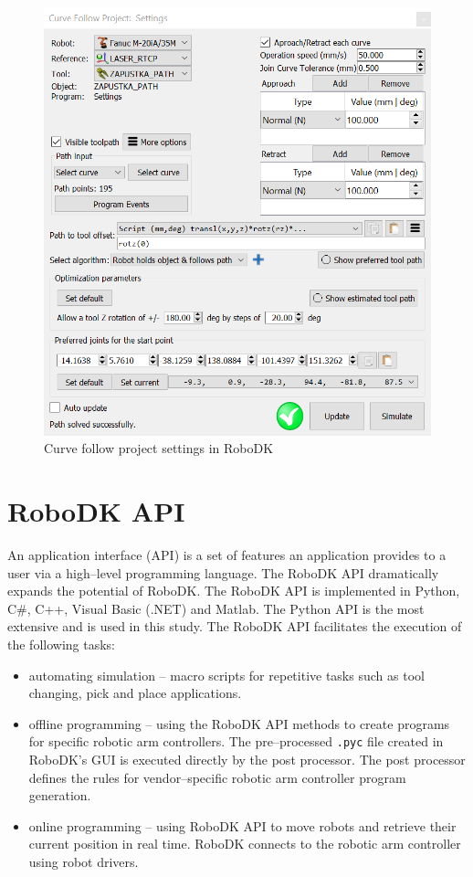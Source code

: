 \begin{figure}[h]
    \centering
    \includegraphics[width=0.9\linewidth]{img/curve_follow_settings.PNG}
    \caption{Curve follow project settings in RoboDK}
    \label{fig:curvefollow}
\end{figure}

\section{RoboDK API}

An application interface (API) is a set of features an application provides to a user via a high--level programming language. The RoboDK API dramatically expands the potential of RoboDK. The RoboDK API is implemented in Python, C\#, C++, Visual Basic (.NET) and Matlab.  The Python API is the most extensive and is used in this study. The RoboDK API facilitates the execution of the following tasks:

\begin{itemize}
    
 \item automating simulation -- macro scripts for repetitive tasks such as tool changing, pick and place applications.

 \item offline programming -- using the RoboDK API methods to create programs for specific robotic arm controllers. The pre--processed \texttt{.pyc} file created in RoboDK's GUI is executed directly by the post processor. The post processor defines the rules for vendor--specific robotic arm controller program generation. 

 \item online programming -- using RoboDK API to move robots and retrieve their current position in real time. RoboDK connects to the robotic arm controller using robot drivers.

\end{itemize}

